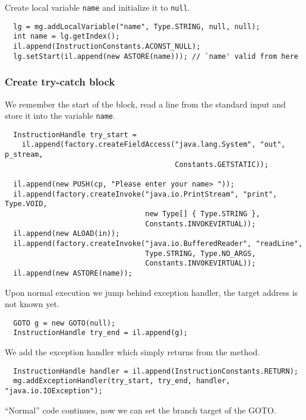 Create local variable \texttt{name} and  initialize it to \texttt{null}.

{\small\begin{verbatim}
  lg = mg.addLocalVariable("name", Type.STRING, null, null);
  int name = lg.getIndex();
  il.append(InstructionConstants.ACONST_NULL);
  lg.setStart(il.append(new ASTORE(name))); // `name' valid from here
\end{verbatim}}

\subsubsection{Create try-catch block}

We remember  the start  of the  block, read a  line from  the standard
input and store it into the variable \texttt{name}.

{\small\begin{verbatim}
  InstructionHandle try_start =
    il.append(factory.createFieldAccess("java.lang.System", "out", p_stream,
                                        Constants.GETSTATIC));

  il.append(new PUSH(cp, "Please enter your name> "));
  il.append(factory.createInvoke("java.io.PrintStream", "print", Type.VOID, 
                                 new Type[] { Type.STRING },
                                 Constants.INVOKEVIRTUAL));
  il.append(new ALOAD(in));
  il.append(factory.createInvoke("java.io.BufferedReader", "readLine",
                                 Type.STRING, Type.NO_ARGS,
                                 Constants.INVOKEVIRTUAL));
  il.append(new ASTORE(name));
\end{verbatim}}

Upon  normal execution we  jump behind  exception handler,  the target
address is not known yet.

{\small\begin{verbatim}
  GOTO g = new GOTO(null);
  InstructionHandle try_end = il.append(g);
\end{verbatim}}

We add the exception handler which simply returns from the method.

{\small\begin{verbatim}
  InstructionHandle handler = il.append(InstructionConstants.RETURN);
  mg.addExceptionHandler(try_start, try_end, handler, "java.io.IOException");
\end{verbatim}}

``Normal'' code continues, now we can set the branch target of the GOTO.

